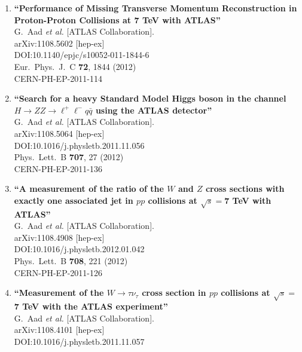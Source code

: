\documentclass{article}
\begin{document}
\begin{enumerate}
\item%
{\bf ``Performance of Missing Transverse Momentum Reconstruction in Proton-Proton Collisions at 7 TeV with ATLAS''}
  \\{}G.~Aad {\it et al.} [ATLAS Collaboration].
  \\{}arXiv:1108.5602 [hep-ex]
  \\{}DOI:10.1140/epjc/s10052-011-1844-6
  \\{}Eur.\ Phys.\ J.\ C {\bf 72}, 1844 (2012)
  \\{}CERN-PH-EP-2011-114
\item%
{\bf ``Search for a heavy Standard Model Higgs boson in the channel $H \to ZZ \to \ell^+ \ell^− q \bar q$ using the ATLAS detector''}
  \\{}G.~Aad {\it et al.} [ATLAS Collaboration].
  \\{}arXiv:1108.5064 [hep-ex]
  \\{}DOI:10.1016/j.physletb.2011.11.056
  \\{}Phys.\ Lett.\ B {\bf 707}, 27 (2012)
  \\{}CERN-PH-EP-2011-136
\item%
{\bf ``A measurement of the ratio of the $W$ and $Z$ cross sections with exactly one associated jet in $pp$ collisions at $\sqrt{s}=$7 TeV with ATLAS''}
  \\{}G.~Aad {\it et al.} [ATLAS Collaboration].
  \\{}arXiv:1108.4908 [hep-ex]
  \\{}DOI:10.1016/j.physletb.2012.01.042
  \\{}Phys.\ Lett.\ B {\bf 708}, 221 (2012)
  \\{}CERN-PH-EP-2011-126
\item%
{\bf ``Measurement of the $W \to \tau \nu_\tau$ cross section in $pp$ collisions at $\sqrt{s}=$7 TeV with the ATLAS experiment''}
  \\{}G.~Aad {\it et al.} [ATLAS Collaboration].
  \\{}arXiv:1108.4101 [hep-ex]
  \\{}DOI:10.1016/j.physletb.2011.11.057

\end{enumerate}
\end{document}
